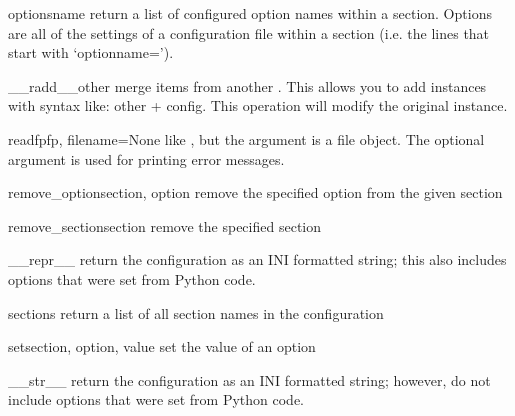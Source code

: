 \begin{methoddesc}[ConfigManager]{options}{name}
return a list of configured option names within a section.  Options are all
of the settings of a configuration file within a section (i.e. the lines that 
start with `optionname=').
\end{methoddesc}

\begin{methoddesc}[ConfigManager]{__radd__}{other}
merge items from another .  This allows you to add
 instances with syntax like: other + config.
This operation will modify the original instance.
\end{methoddesc}

\begin{methoddesc}[ConfigManager]{readfp}{fp, filename=None}
like , but the argument is a file object.  The optional
 argument is used for printing error messages.
\end{methoddesc}

\begin{methoddesc}[ConfigManager]{remove_option}{section, option}
remove the specified option from the given section
\end{methoddesc}

\begin{methoddesc}[ConfigManager]{remove_section}{section}
remove the specified section
\end{methoddesc}

\begin{methoddesc}[ConfigManager]{__repr__}{}
return the configuration as an INI formatted string; this also includes 
options that were set from Python code.
\end{methoddesc}

\begin{methoddesc}[ConfigManager]{sections}{}
return a list of all section names in the configuration
\end{methoddesc}

\begin{methoddesc}[ConfigManager]{set}{section, option, value}
set the value of an option
\end{methoddesc}

\begin{methoddesc}[ConfigManager]{__str__}{}
return the configuration as an INI formatted string; however, do not 
include options that were set from Python code.
\end{methoddesc}

